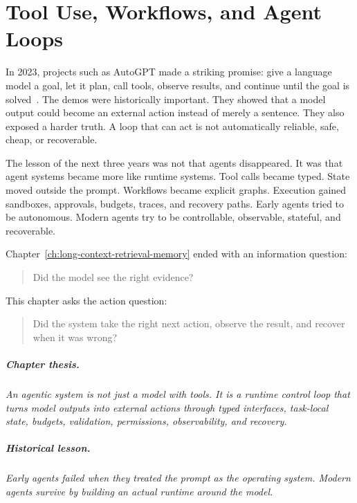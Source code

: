 \chapter{Tool Use, Workflows, and Agent Loops}
\label{ch:tool-use-agent-loops}
\raggedbottom

In 2023, projects such as AutoGPT made a striking promise: give a language model a goal, let it plan, call tools, observe results, and continue until the goal is solved~\cite{autogpt2023}. The demos were historically important. They showed that a model output could become an external action instead of merely a sentence. They also exposed a harder truth. A loop that can act is not automatically reliable, safe, cheap, or recoverable.

The lesson of the next three years was not that agents disappeared. It was that agent systems became more like runtime systems. Tool calls became typed. State moved outside the prompt. Workflows became explicit graphs. Execution gained sandboxes, approvals, budgets, traces, and recovery paths. Early agents tried to be autonomous. Modern agents try to be controllable, observable, stateful, and recoverable.

Chapter~\ref{ch:long-context-retrieval-memory} ended with an information question:

\begin{quote}
Did the model see the right evidence?
\end{quote}

This chapter asks the action question:

\begin{quote}
Did the system take the right next action, observe the result, and recover when it was wrong?
\end{quote}

\paragraph{Chapter thesis.} \emph{An agentic system is not just a model with tools. It is a runtime control loop that turns model outputs into external actions through typed interfaces, task-local state, budgets, validation, permissions, observability, and recovery.}

\paragraph{Historical lesson.} \emph{Early agents failed when they treated the prompt as the operating system. Modern agents survive by building an actual runtime around the model.}

